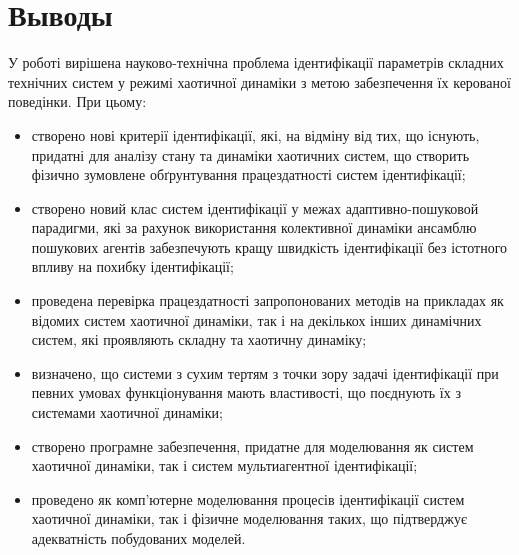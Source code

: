 \clearpage
{}
\chapter*{Выводы}


У роботі вирішена науково-технічна проблема ідентифікації параметрів складних технічних
систем у режимі хаотичної динаміки
з метою забезпечення їх керованої поведінки. При цьому:

\begin{itemize}

  \item
    створено нові критерії ідентифікації, які, на відміну від тих, що
    існують, придатні для аналізу стану та динаміки
    хаотичних систем, що створить фізично зумовлене обґрунтування працездатності систем
    ідентифікації;

  \item
    створено новий клас систем ідентифікації у межах
    адаптивно-пошуковой парадигми,
    які за рахунок використання колективної динаміки
    ансамблю пошукових агентів забезпечують
    кращу швидкість ідентифікації без істотного впливу на похибку ідентифікації;

  \item
    проведена перевірка працездатності запропонованих методів
    на прикладах як відомих систем хаотичної динаміки,
    так і на декількох інших динамічних систем, які проявляють
    складну та хаотичну динаміку;

  \item
   визначено, що системи з сухим тертям з точки зору задачі ідентифікації
   при певних  умовах функціонування
   мають властивості, що поєднують їх з системами хаотичної динаміки;

 \item
  створено програмне забезпечення, придатне для моделювання як систем
  хаотичної динаміки, так і систем мультиагентної ідентифікації;

  \item
  проведено як комп'ютерне моделювання процесів ідентифікації систем
  хаотичної динаміки, так і фізичне моделювання таких, що підтверджує адекватність
  побудованих моделей.

\end{itemize}


